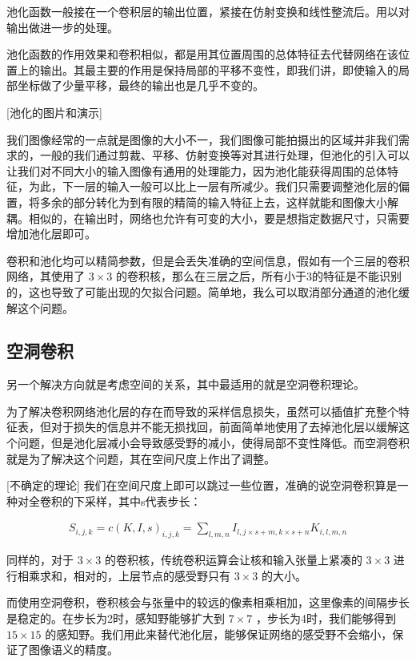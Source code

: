 池化函数一般接在一个卷积层的输出位置，紧接在仿射变换和线性整流后。用以对输出做进一步的处理。

池化函数的作用效果和卷积相似，都是用其位置周围的总体特征去代替网络在该位置上的输出。其最主要的作用是保持局部的平移不变性，即我们讲，即使输入的局部坐标做了少量平移，最终的输出也是几乎不变的。

[池化的图片和演示]

我们图像经常的一点就是图像的大小不一，我们图像可能拍摄出的区域并非我们需求的，一般的我们通过剪裁、平移、仿射变换等对其进行处理，但池化的引入可以让我们对不同大小的输入图像有通用的处理能力，因为池化能获得周围的总体特征，为此，下一层的输入一般可以比上一层有所减少。我们只需要调整池化层的偏置，将多余的部分转化为到有限的精简的输入特征上去，这样就能和图像大小解耦。相似的，在输出时，网络也允许有可变的大小，要是想指定数据尺寸，只需要增加池化层即可。

卷积和池化均可以精简参数，但是会丢失准确的空间信息，假如有一个三层的卷积网络，其使用了 $ 3 \times 3 $ 的卷积核，那么在三层之后，所有小于3的特征是不能识别的，这也导致了可能出现的欠拟合问题。简单地，我么可以取消部分通道的池化缓解这个问题。

\subsection{空洞卷积}

另一个解决方向就是考虑空间的关系，其中最适用的就是空洞卷积理论。

为了解决卷积网络池化层的存在而导致的采样信息损失，虽然可以插值扩充整个特征表，但对于损失的信息并不能无损找回，前面简单地使用了去掉池化层以缓解这个问题，但是池化层减小会导致感受野的减小，使得局部不变性降低。而空洞卷积就是为了解决这个问题，其在空间尺度上作出了调整。

[不确定的理论]
我们在空间尺度上即可以跳过一些位置，准确的说空洞卷积算是一种对全卷积的下采样，其中s代表步长：

\begin{eqnarray}
    S_{i,j,k} = c(K,I,s)_{i,j,k} = \sum_{l,m,n}I_{l,j \times s+m ,k \times s +n}K_{i,l,m,n}
\end{eqnarray}


同样的，对于 $ 3 \times 3 $ 的卷积核，传统卷积运算会让核和输入张量上紧凑的 $ 3 \times 3 $ 进行相乘求和，相对的，上层节点的感受野只有 $ 3 \times 3 $ 的大小。

而使用空洞卷积，卷积核会与张量中的较远的像素相乘相加，这里像素的间隔步长是稳定的。在步长为2时，感知野能够扩大到 $ 7 \times 7 $ ，步长为4时，我们能够得到 $ 15 \times 15 $ 的感知野。我们用此来替代池化层，能够保证网络的感受野不会缩小，保证了图像语义的精度。 

